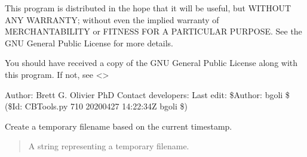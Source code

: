 \documentclass[letterpaper,12pt,english]{sphinxmanual}
\begin{document}
\sphinxAtStartPar
This program is distributed in the hope that it will be useful,
but WITHOUT ANY WARRANTY; without even the implied warranty of
MERCHANTABILITY or FITNESS FOR A PARTICULAR PURPOSE.  See the
GNU General Public License for more details.

\sphinxAtStartPar
You should have received a copy of the GNU General Public License
along with this program.  If not, see \textless{}\textgreater{}

\sphinxAtStartPar
Author: Brett G. Olivier PhD
Contact developers: 
Last edit: \$Author: bgoli \$ (\$Id: CBTools.py 710 2020\sphinxhyphen{}04\sphinxhyphen{}27 14:22:34Z bgoli \$)

\begin{fulllineitems}
\label{\detokenize{api/core:cbmpy.CBTools.createTempFileName}}
\pysigstartsignatures
\pysiglinewithargsret
{}
{}
{}
\pysigstopsignatures
\sphinxAtStartPar
Create a temporary filename based on the current timestamp.
\begin{quote}\begin{description}
\sphinxAtStartPar
{} \textendash{} A string representing a temporary filename.

\end{description}\end{quote}

\end{fulllineitems}

\end{document}
